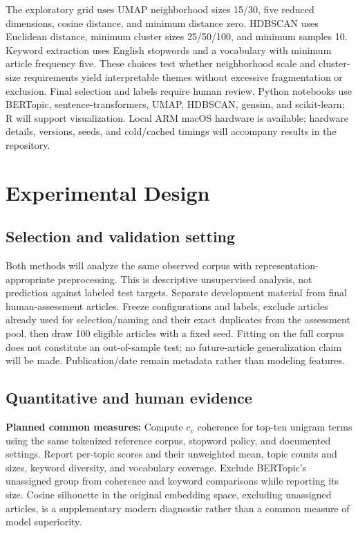 \documentclass[conference]{IEEEtran}
\begin{document}
The exploratory grid uses UMAP neighborhood sizes 15/30, five reduced dimensions, cosine distance, and minimum distance zero. HDBSCAN uses Euclidean distance, minimum cluster sizes 25/50/100, and minimum samples 10. Keyword extraction uses English stopwords and a vocabulary with minimum article frequency five. These choices test whether neighborhood scale and cluster-size requirements yield interpretable themes without excessive fragmentation or exclusion. Final selection and labels require human review. Python notebooks use BERTopic, sentence-transformers, UMAP, HDBSCAN, gensim, and scikit-learn; R will support visualization. Local ARM macOS hardware is available; hardware details, versions, seeds, and cold/cached timings will accompany results in the repository.

\section{Experimental Design}
\subsection{Selection and validation setting}
Both methods will analyze the same observed corpus with representation-appropriate preprocessing. This is descriptive unsupervised analysis, not prediction against labeled test targets. Separate development material from final human-assessment articles. Freeze configurations and labels, exclude articles already used for selection/naming and their exact duplicates from the assessment pool, then draw 100 eligible articles with a fixed seed. Fitting on the full corpus does not constitute an out-of-sample test; no future-article generalization claim will be made. Publication/date remain metadata rather than modeling features.

\subsection{Quantitative and human evidence}
\textbf{Planned common measures:} Compute $c_v$ coherence for top-ten unigram terms using the same tokenized reference corpus, stopword policy, and documented settings. Report per-topic scores and their unweighted mean, topic counts and sizes, keyword diversity, and vocabulary coverage. Exclude BERTopic's unassigned group from coherence and keyword comparisons while reporting its size. Cosine silhouette in the original embedding space, excluding unassigned articles, is a supplementary modern diagnostic rather than a common measure of model superiority.
\end{document}
